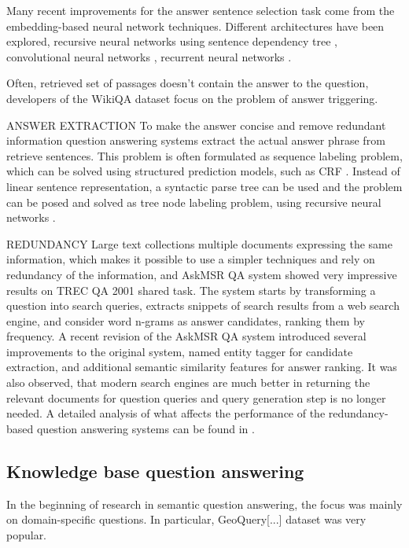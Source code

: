 Many recent improvements for the answer sentence selection task come from the embedding-based neural network techniques.
Different architectures have been explored, \eg recursive neural networks using sentence dependency tree \cite{iyyer2014neural}, convolutional neural networks \cite{yu2014deep}, recurrent neural networks \cite{tan2015lstm,WangN15}.

Often, retrieved set of passages doesn't contain the answer to the question, developers of the WikiQA dataset \cite{yang2015wikiqa} focus on the problem of answer triggering.

ANSWER EXTRACTION
To make the answer concise and remove redundant information question answering systems extract the actual answer phrase from retrieve sentences.
This problem is often formulated as sequence labeling problem, which can be solved using structured prediction models, such as CRF \cite{yao2013answer}.
Instead of linear sentence representation, a syntactic parse tree can be used and the problem can be posed and solved as tree node labeling problem, \eg using recursive neural networks \cite{malon2013answer}.



REDUNDANCY
Large text collections multiple documents expressing the same information, which makes it possible to use a simpler techniques and rely on redundancy of the information, and AskMSR QA system \cite{brill2002analysis} showed very impressive results on TREC QA 2001 shared task.
The system starts by transforming a question into search queries, extracts snippets of search results from a web search engine, and consider word n-grams as answer candidates, ranking them by frequency.
A recent revision of the AskMSR QA system \cite{tsai2015web} introduced several improvements to the original system, \ie named entity tagger for candidate extraction, and additional semantic similarity features for answer ranking.
It was also observed, that modern search engines are much better in returning the relevant documents for question queries and query generation step is no longer needed.
A detailed analysis of what affects the performance of the redundancy-based question answering systems can be found in \cite{lin2007exploration}.



\subsection{Knowledge base question answering}

In the beginning of research in semantic question answering, the focus was mainly on domain-specific questions.
In particular, GeoQuery[...] dataset was very popular.


